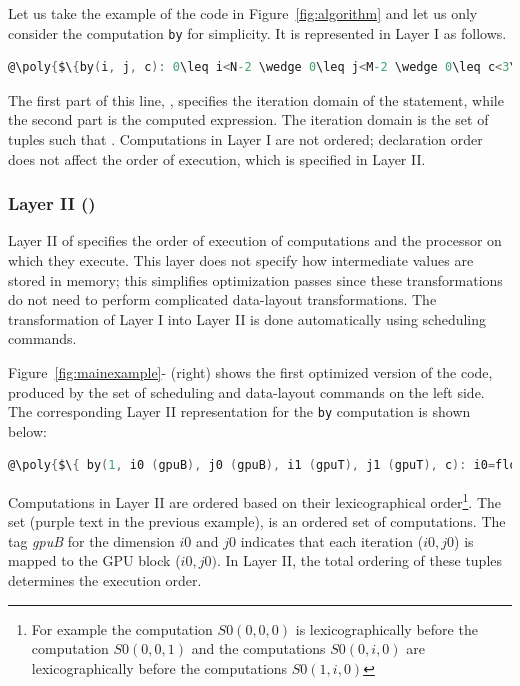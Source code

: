 Let us take the example of the code in Figure~\ref{fig:algorithm} and let us only consider the computation \texttt{by} for simplicity. It is represented in Layer I as follows.

\begin{lstlisting}[language=C,escapechar=@]
@\poly{$\{by(i, j, c): 0\leq i<N-2 \wedge 0\leq j<M-2 \wedge 0\leq c<3\}$}@:(bx(i,j,c)+bx(i+1,j,c)+bx(i+2,j,c))/3
\end{lstlisting}

The first part of this line, 
, specifies the iteration domain of the statement, while the second part %
is the computed expression.
The iteration domain is the set of tuples  such that .
Computations in Layer I are not ordered;  declaration order does not affect the order of execution, which is specified in Layer II. 

\subsubsection{Layer II (\Layertwo)}
\label{layer2}

Layer II of \framework{} specifies the order of execution of computations and the processor on which they execute.  This layer does not specify how intermediate values are stored in memory; this simplifies optimization passes since these transformations do not need to perform complicated data-layout transformations.  The transformation of Layer I into Layer II is done automatically using scheduling commands.

Figure~\ref{fig:mainexample}-\codetwo{} (right) shows the first optimized version of the code, produced by the set of scheduling and data-layout commands on the left side.
The corresponding Layer II representation for the \texttt{by} computation is shown below:

\begin{lstlisting}[language=C,escapechar=@]
@\poly{$\{ by(1, i0 (gpuB), j0 (gpuB), i1 (gpuT), j1 (gpuT), c): i0=floor(i, 32) \wedge j0=floor(j, 32) \wedge i1=i\%32 \wedge j1=j\%32 \wedge 0\leq i<N-2 \wedge 0\leq j<M-2 \wedge 0\leq c<3\}$} @: (bx(i,j,c)+bx(i+1,j,c)+bx(i+2,j,c))/3
\end{lstlisting}

Computations in Layer II are ordered based on their lexicographical order\footnote{For example the computation $S0(0, 0, 0)$ is lexicographically before the computation \mbox{$S0(0, 0, 1)$} and the computations $S0(0, i, 0)$ are lexicographically before the computations $S0(1, i, 0)$}.  The set (purple text in the previous example), is an ordered set of computations.
The tag \emph{gpuB} for the dimension $i0$ and $j0$ indicates that each iteration ($i0,j0$) is mapped to the GPU block ($i0,j0)$. In Layer II, the total ordering of these tuples determines the execution order.

